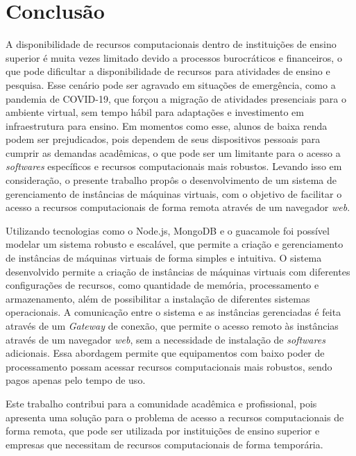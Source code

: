 \chapter{Conclus\~ao}\label{cap:conclusao}


A disponibilidade de recursos computacionais dentro de instituições de ensino superior é muita vezes limitado devido a processos burocráticos e financeiros, o que pode dificultar a disponibilidade de recursos para atividades de ensino e pesquisa. Esse cenário pode ser agravado em situações de emergência, como a pandemia de COVID-19, que forçou a migração de atividades presenciais para o ambiente virtual, sem tempo hábil para adaptações e investimento em infraestrutura para ensino. Em momentos como esse, alunos de baixa renda podem ser prejudicados, pois dependem de seus dispositivos pessoais para cumprir as demandas acadêmicas, o que pode ser um limitante para o acesso a \textit{softwares} específicos e recursos computacionais mais robustos. Levando isso em consideração, o presente trabalho propôs o desenvolvimento de um sistema de gerenciamento de instâncias de máquinas virtuais, com o objetivo de facilitar o acesso a recursos computacionais de forma remota através de um navegador \textit{web}.

Utilizando tecnologias como o Node.js, MongoDB e o \gls{guacamole} foi possível modelar um sistema robusto e escalável, que permite a criação e gerenciamento de instâncias de máquinas virtuais de forma simples e intuitiva. O sistema desenvolvido permite a criação de instâncias de máquinas virtuais com diferentes configurações de recursos, como quantidade de memória, processamento e armazenamento, além de possibilitar a instalação de diferentes sistemas operacionais. A comunicação entre o sistema e as instâncias gerenciadas é feita através de um \textit{Gateway} de conexão, que permite o acesso remoto às instâncias através de um navegador \textit{web}, sem a necessidade de instalação de \textit{softwares} adicionais. Essa abordagem permite que equipamentos com baixo poder de processamento possam acessar recursos computacionais mais robustos, sendo pagos apenas pelo tempo de uso.

Este trabalho contribui para a comunidade acadêmica e profissional, pois apresenta uma solução para o problema de acesso a recursos computacionais de forma remota, que pode ser utilizada por instituições de ensino superior e empresas que necessitam de recursos computacionais de forma temporária.

